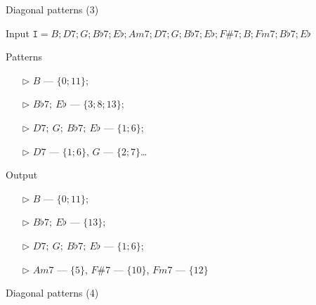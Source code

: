 \documentclass[10pt]{beamer}
\begin{document}
\begin{frame}{Diagonal patterns (3)}
\begin{block}{Input}
$\texttt{I}=
B;D 7;G;B\flat 7;E\flat;A m7;D 7;G;B\flat 7;E\flat;F\# 7;B;F m7;B\flat 7;E\flat$
\end{block} \pause

\begin{block}{Patterns}
\begin{itemize}
\item[$\triangleright$] $B$ --- $\{0;11\}$;
\item[$\triangleright$] $B\flat 7;~E\flat$ --- $\{3;8;13\}$;
\item[$\triangleright$] $D7;~G;~B\flat 7;~E\flat$ --- $\{1;6\}$; \pause
\item[$\triangleright$] $D7$ --- $\{1;6\}$, $G$ --- $\{2;7\}$\dots
\end{itemize}
\end{block} \pause

\begin{block}{Output}
\begin{itemize}
\item[$\triangleright$] $B$ --- $\{0;11\}$;
\item[$\triangleright$] $B\flat 7;~E\flat$ --- $\{13\}$;
\item[$\triangleright$] $D7;~G;~B\flat 7;~E\flat$ --- $\{1;6\}$;
\item[$\triangleright$] $Am7$ --- $\{5\}$, $F\#7$ --- $\{10\}$, $Fm7$ --- $\{12\}$
\end{itemize}
\end{block}
\end{frame}

\begin{frame}{Diagonal patterns (4)}
\begin{figure}
\centering
{}
\end{figure}
\end{frame}
\end{document}
